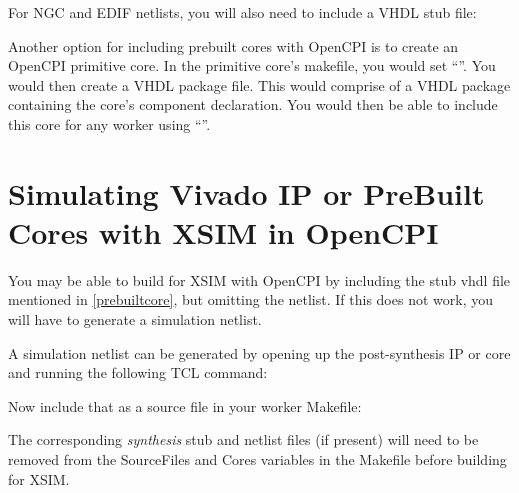 \begin{flushleft}
For NGC and EDIF netlists, you will also need to include a VHDL stub file:\newline
{}\newline

Another option for including prebuilt cores with OpenCPI is to create an OpenCPI primitive core. In the primitive core's makefile, you would set ``''. You would then create a VHDL package file. This would comprise of a VHDL package containing the core's component declaration. You would then be able to include this core for any worker using ``''.

\section{Simulating Vivado IP or PreBuilt Cores with XSIM in OpenCPI}
\label{sim_ip}
You may be able to build for XSIM with OpenCPI by including the stub vhdl file mentioned in \ref{prebuiltcore}, but omitting the netlist. If this does not work, you will have to generate a simulation netlist. \newline

A simulation netlist can be generated by opening up the post-synthesis IP or core and running the following TCL command:\newline
{}\newline

Now include that as a source file in your worker Makefile:\newline {}\newline

The corresponding \textit{synthesis} stub and netlist files (if present) will need to be removed from the SourceFiles and Cores variables in the Makefile before building for XSIM.


\end{flushleft}
